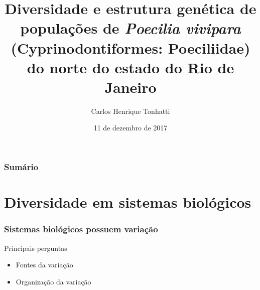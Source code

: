 \documentclass{beamer}
\title[Defesa de Doutorado]{Diversidade e estrutura genética de populações de
\textit{Poecilia vivipara} (Cyprinodontiformes: Poeciliidae) do norte do estado do Rio de Janeiro}
\author {Carlos Henrique Tonhatti}
\institute[Unicamp]{Universidade Estadual de Campinas}
\date{11 de dezembro de 2017}
\begin{document}
 \frame{\titlepage} %


\begin{frame}
 \frametitle{Sumário}
 \tableofcontents[pausesections]
  \setcounter{tocdepth}{2}%
\end{frame}




\section{Diversidade em sistemas biológicos}
\begin{frame}
  \frametitle{Sistemas biológicos possuem variação}
  \begin{center}
  \end{center}
\end{frame}

\begin{frame}{Principais perguntas}

  \begin{itemize}[<+->]
  \item  Fontes da variação
  \item  Organiza\c{c}ão da variação
  \end{itemize}
  \vspace{20pt}

  
\end{frame}
\end{document}
